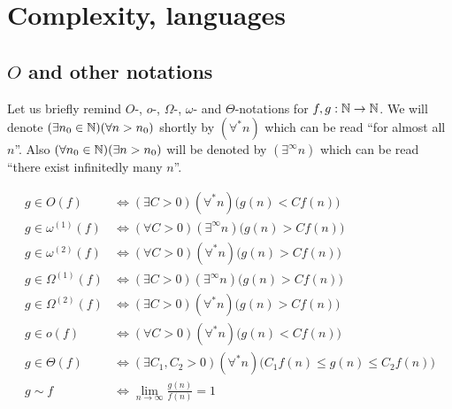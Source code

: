 \section{Complexity, languages}
	
	\subsection{$O$ and other notations}
		
		Let us briefly remind $O$-, $o$-, $\Omega$-, $\omega$- and $\Theta$-notations for $f, g: \mathbb{N} \rightarrow \mathbb{N}$. We will denote $(\exists n_0 \in \mathbb{N}) (\forall n > n_0)$ shortly by $(\forall^* n)$ which can be read ``for almost all $n$''. Also $(\forall n_0 \in \mathbb{N}) (\exists n > n_0)$ will be denoted by $(\exists^\infty n)$ which can be read ``there exist infinitedly many $n$''.
		\begin{defn}
		\begin{align*}
			g \in O(f) &\iff (\exists C > 0) (\forall^* n) \bigl(g(n) < C f(n)\bigr) \\[5pt]
			g \in \omega^{(1)}(f) &\iff (\forall C > 0) (\exists^\infty n) \bigl(g(n) > C f(n)\bigr) \\[5pt]
			g \in \omega^{(2)}(f) &\iff (\forall C > 0) (\forall^* n) \bigl(g(n) > C f(n)\bigr) \\[5pt]
			g \in \Omega^{(1)}(f) &\iff (\exists C > 0) (\exists^\infty n) \bigl(g(n) > C f(n)\bigr) \\[5pt]
			g \in \Omega^{(2)}(f) &\iff (\exists C > 0) (\forall^* n) \bigl(g(n) > C f(n)\bigr) \\[5pt]
			g \in o(f) &\iff (\forall C > 0) (\forall^* n) \bigl(g(n) < C f(n)\bigr) \\[5pt]
			g \in \Theta(f) &\iff (\exists C_1, C_2 > 0) (\forall^* n) \bigl(C_1 f(n) \leq g(n) \leq C_2 f(n)\bigr) \\[5pt]
			g \sim f &\iff \lim\limits_{n\to\infty} \frac{g(n)}{f(n)} = 1
		\end{align*}
		\end{defn}
		
